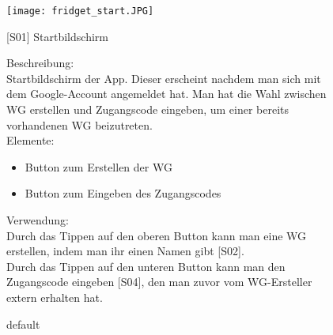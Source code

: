 \documentclass[a4paper]{scrreprt}
\begin{document}
        \begin{figure}[h]
        	\begin{minipage}[b]{0.4\linewidth}
        		
        		\flushright
        		\centering
        		\texttt{[image: fridget\_start.JPG]}
        		\caption{default}
        		\label{fig:figure1}
        	\end{minipage}
        	\hspace{0.5cm}
        	\begin{minipage}[b]{0.55\linewidth}
        		\flushleft
        		{[}S01{]} Startbildschirm 
        		
        		Beschreibung: \\
        		Startbildschirm der App. Dieser erscheint nachdem man sich mit dem Google-Account angemeldet hat. Man hat die Wahl zwischen WG erstellen und Zugangscode eingeben, um einer bereits vorhandenen WG beizutreten.
        		\\
        		Elemente:
        		\begin{itemize}
        		\item Button zum Erstellen der WG
        		\item Button zum Eingeben des Zugangscodes
        		\end{itemize}
        		
        		Verwendung:\\
        		Durch das Tippen auf den oberen Button
        		kann man eine WG erstellen, indem man ihr
        		einen Namen gibt {[}S02{]}.\\
        		Durch das Tippen auf den unteren Button kann
        		man den Zugangscode eingeben {[}S04{]}, den man zuvor vom WG-Ersteller extern erhalten 
        		hat.
        		
        	\end{minipage}
        \end{figure}
    
\end{document}
